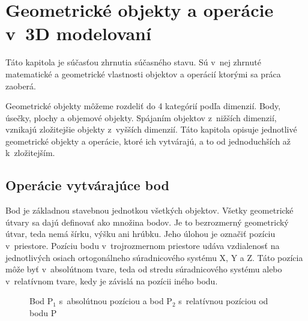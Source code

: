 \chapter{Geometrické objekty a operácie v~3D modelovaní}
\label{chapt:Geometrické_tvary}
Táto kapitola je súčasťou zhrnutia súčasného stavu. Sú v~nej zhrnuté matematické a geometrické vlastnosti objektov a operácií ktorými sa práca zaoberá.

Geometrické objekty môžeme rozdeliť do 4 kategórií podľa dimenzií. Body, úsečky, plochy a objemové objekty.
Spájaním objektov z~nižších dimenzií, vznikajú zložitejšie objekty z~vyšších dimenzií. Táto kapitola opisuje jednotlivé geometrické objekty a operácie, ktoré ich vytvárajú, a to od jednoduchších až k~zložitejším.

\section{Operácie vytvárajúce bod }
Bod je základnou stavebnou jednotkou všetkých objektov. Všetky geometrické útvary sa dajú definovať ako množina bodov. Je to bezrozmerný geometrický útvar, teda nemá šírku, výšku ani hrúbku. Jeho úlohou je označiť pozíciu v~priestore. Pozíciu bodu v~trojrozmernom priestore udáva vzdialenosť na jednotlivých osiach ortogonálneho súradnicového systému X, Y a Z. Táto pozícia môže byť v~absolútnom tvare, teda od stredu súradnicového systému alebo v~relatívnom tvare, kedy je závislá na pozícii iného bodu.



\begin{figure}[H]
	\centering
	\caption{Bod P$_1$ s~absolútnou pozíciou a bod P$_2$ s~relatívnou pozíciou od bodu P}
	\label{fig:Point}
\end{figure}

